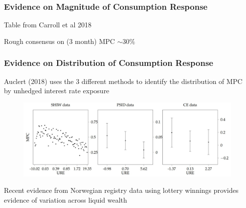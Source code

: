 \documentclass{beamer}
\begin{document}
\frame
{
	\frametitle{Evidence on Magnitude of Consumption Response}
	\begin{center}
	\tiny{Table from Carroll et al 2018}
\end{center}
Rough consensus on (3 month) MPC $\sim 30\%$
}
\frame
{
	\frametitle{Evidence on Distribution of Consumption Response}
	Auclert (2018) uses the 3 different methods to identify the distribution of MPC by unhedged interest rate exposure
	\begin{figure}
		\includegraphics[scale=0.6]{../Figures/MPCDistributionAuclert}
	\end{figure}
	Recent evidence from Norwegian registry data using lottery winnings provides evidence of variation across liquid wealth
}
\end{document}
